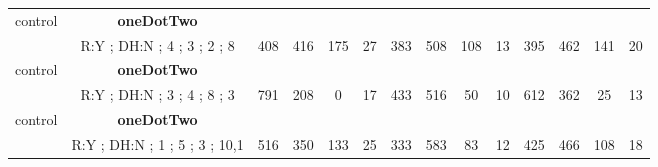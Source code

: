 \begin{table}[]
{\begin{tabular}{|c|c|c|c|c|c|c|c|c|c|c|c|c|c|}
control & \cellcolor{blue!15}\textbf{oneDotTwo}& {\color[HTML]{00009B} } & {\color[HTML]{9A0000} } & {\color[HTML]{009901} } &  & {\color[HTML]{00009B} } & {\color[HTML]{9A0000} } & {\color[HTML]{009901} } &  & {\color[HTML]{00009B} } & {\color[HTML]{9A0000} } & {\color[HTML]{009901} } &  \\ 
 & \cellcolor{ blue!15}R:Y ; DH:N ; 4 ; 3 ; 2 ; 8 & \multirow{-2}{*}{{\color[HTML]{00009B} 408}} & \multirow{-2}{*}{{\color[HTML]{9A0000} 416}} & \multirow{-2}{*}{{\color[HTML]{009901} 175}} & \multirow{-2}{*}{27} & \multirow{-2}{*}{{\color[HTML]{00009B} 383}} & \multirow{-2}{*}{{\color[HTML]{9A0000} 508}} & \multirow{-2}{*}{{\color[HTML]{009901} 108}} & \multirow{-2}{*}{13} & \multirow{-2}{*}{{\color[HTML]{00009B} 395}} & \multirow{-2}{*}{{\color[HTML]{9A0000} 462}} & \multirow{-2}{*}{{\color[HTML]{009901} 141}} & \multirow{-2}{*}{20} \\ \hline

control & \cellcolor{blue!15}\textbf{oneDotTwo}& {\color[HTML]{00009B} } & {\color[HTML]{9A0000} } & {\color[HTML]{009901} } &  & {\color[HTML]{00009B} } & {\color[HTML]{9A0000} } & {\color[HTML]{009901} } &  & {\color[HTML]{00009B} } & {\color[HTML]{9A0000} } & {\color[HTML]{009901} } &  \\ 
 & \cellcolor{ blue!15}R:Y ; DH:N ; 3 ; 4 ; 8 ; 3 & \multirow{-2}{*}{{\color[HTML]{00009B} 791}} & \multirow{-2}{*}{{\color[HTML]{9A0000} 208}} & \multirow{-2}{*}{{\color[HTML]{009901} 0}} & \multirow{-2}{*}{17} & \multirow{-2}{*}{{\color[HTML]{00009B} 433}} & \multirow{-2}{*}{{\color[HTML]{9A0000} 516}} & \multirow{-2}{*}{{\color[HTML]{009901} 50}} & \multirow{-2}{*}{10} & \multirow{-2}{*}{{\color[HTML]{00009B} 612}} & \multirow{-2}{*}{{\color[HTML]{9A0000} 362}} & \multirow{-2}{*}{{\color[HTML]{009901} 25}} & \multirow{-2}{*}{13} \\ \hline

control & \cellcolor{blue!15}\textbf{oneDotTwo}& {\color[HTML]{00009B} } & {\color[HTML]{9A0000} } & {\color[HTML]{009901} } &  & {\color[HTML]{00009B} } & {\color[HTML]{9A0000} } & {\color[HTML]{009901} } &  & {\color[HTML]{00009B} } & {\color[HTML]{9A0000} } & {\color[HTML]{009901} } &  \\ 
 & \cellcolor{ blue!15}R:Y ; DH:N ; 1 ; 5 ; 3 ; 10,1 & \multirow{-2}{*}{{\color[HTML]{00009B} 516}} & \multirow{-2}{*}{{\color[HTML]{9A0000} 350}} & \multirow{-2}{*}{{\color[HTML]{009901} 133}} & \multirow{-2}{*}{25} & \multirow{-2}{*}{{\color[HTML]{00009B} 333}} & \multirow{-2}{*}{{\color[HTML]{9A0000} 583}} & \multirow{-2}{*}{{\color[HTML]{009901} 83}} & \multirow{-2}{*}{12} & \multirow{-2}{*}{{\color[HTML]{00009B} 425}} & \multirow{-2}{*}{{\color[HTML]{9A0000} 466}} & \multirow{-2}{*}{{\color[HTML]{009901} 108}} & \multirow{-2}{*}{18} \\ \hline


\end{tabular}}
\end{table}
